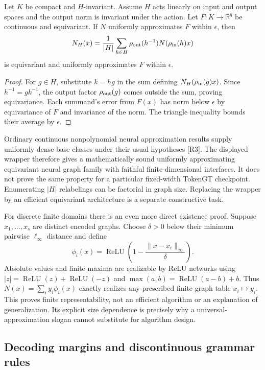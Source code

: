 \begin{proposition}
Let $K$ be compact and $H$-invariant. Assume $H$ acts linearly on input and output spaces and the output norm is invariant under the action. Let $F:K\to\mathbb R^q$ be continuous and equivariant. If $N$ uniformly approximates $F$ within $\epsilon$, then
\[
 N_H(x)=\frac1{|H|}\sum_{h\in H}\rho_{\rm out}(h^{-1})
 N(\rho_{\rm in}(h)x)
\]
is equivariant and uniformly approximates $F$ within $\epsilon$.
\end{proposition}
\begin{proof}
For $g\in H$, substitute $k=hg$ in the sum defining $N_H(\rho_{\rm in}(g)x)$. Since $h^{-1}=gk^{-1}$, the output factor $\rho_{\rm out}(g)$ comes outside the sum, proving equivariance. Each summand's error from $F(x)$ has norm below $\epsilon$ by equivariance of $F$ and invariance of the norm. The triangle inequality bounds their average by $\epsilon$.
\end{proof}

Ordinary continuous nonpolynomial neural approximation results supply uniformly dense base classes under their usual hypotheses [R3]. The displayed wrapper therefore gives a mathematically sound uniformly approximating equivariant neural graph family with faithful finite-dimensional interfaces. It does not prove the same property for a particular fixed-width TokenGT checkpoint. Enumerating $|H|$ relabelings can be factorial in graph size. Replacing the wrapper by an efficient equivariant architecture is a separate constructive task.

For discrete finite domains there is an even more direct existence proof. Suppose $x_1,\ldots,x_s$ are distinct encoded graphs. Choose $\delta>0$ below their minimum pairwise $\ell_\infty$ distance and define
\[
 \phi_i(x)=\operatorname{ReLU}\left(1-\frac{\|x-x_i\|_\infty}{\delta}\right).
\]
Absolute values and finite maxima are realizable by ReLU networks using $|z|=\operatorname{ReLU}(z)+\operatorname{ReLU}(-z)$ and $\max(a,b)=\operatorname{ReLU}(a-b)+b$. Thus $N(x)=\sum_i y_i\phi_i(x)$ exactly realizes any prescribed finite graph table $x_i\mapsto y_i$. This proves finite representability, not an efficient algorithm or an explanation of generalization. Its explicit size dependence is precisely why a universal-approximation slogan cannot substitute for algorithm design.

\subsection{Decoding margins and discontinuous grammar rules}

